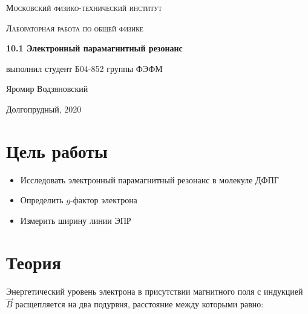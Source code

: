 \documentclass[a4paper]{article}
\begin{document}
\graphicspath{ {pictures/} }

\begin{titlepage}
	\centering
	\vspace{5cm}
    {\scshape\LARGE Московский физико-технический институт\par}
	\vspace{5cm}
	{\scshape\Large Лабораторная работа по общей физике \par}
	\vspace{1cm}
    {\huge\bfseries  10.1 Электронный парамагнитный резонанс \par}
	\vspace{1cm}
	\vfill
    \begin{flushright}
        {\large выполнил студент Б04-852 группы ФЭФМ}\par
        \vspace{0.3cm}
        {\LARGE Яромир Водзяновский}
    \end{flushright}
	\vfill
Долгопрудный, 2020
\end{titlepage}

\pagestyle{fancy} 
\fancyhead[C]{}
\fancyfoot[C]{ \noindent\rule{\textwidth}{0.4pt} \thepage }

\tableofcontents

\newpage



\section{Цель работы}

\begin{itemize}
    \item Исследовать электронный парамагнитный резонанс в молекуле ДФПГ
    \item Определить $g$-фактор электрона
    \item Измерить ширину линии ЭПР
\end{itemize}



\section{Теория}

Энергетический уровень электрона в присутствии магнитного поля с индукцией $\vec{B}$ расщепляется на два подурвня, расстояние между которыми равно:
\end{document}

